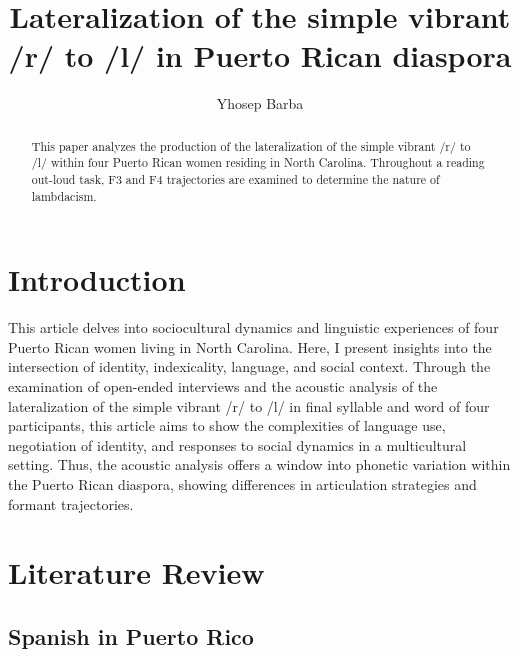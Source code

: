 \documentclass[
  a4paper,
  11pt,
  twocolumn]{article}
\author{}
\date{\vspace{-2.5em}}
\begin{document}
\title{Lateralization of the simple vibrant /r/ to /l/ in Puerto Rican diaspora}
\author{Yhosep Barba}


\maketitle

\begin{abstract}
This paper analyzes the production of the lateralization of the simple vibrant /r/ to /l/  within four Puerto Rican women residing in North Carolina. Throughout a reading out-loud task, F3 and F4 trajectories are examined to determine the nature of lambdacism.
\end{abstract}



\section{Introduction}

This article delves into sociocultural dynamics and linguistic
experiences of four Puerto Rican women living in North Carolina. Here, I
present insights into the intersection of identity, indexicality,
language, and social context. Through the examination of open-ended
interviews and the acoustic analysis of the lateralization of the simple
vibrant /r/ to /l/ in final syllable and word of four participants, this
article aims to show the complexities of language use, negotiation of
identity, and responses to social dynamics in a multicultural setting.
Thus, the acoustic analysis offers a window into phonetic variation
within the Puerto Rican diaspora, showing differences in articulation
strategies and formant trajectories.

\section{Literature Review}

\subsection{Spanish in Puerto Rico}
\end{document}
